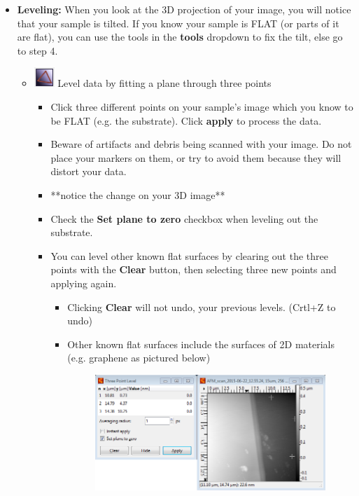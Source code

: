 \documentclass{../lab}
\begin{document}
\begin{itemize}
    \item\textbf{Leveling:} When you look at the 3D projection of your image, you will notice that your sample is tilted. If you know your sample is FLAT (or parts of it are flat), you can use the tools in the \textbf{tools} dropdown to fix the tilt, else go to step 4.
    \begin{itemize}
        \item \includegraphics[height=2em]{images/44.png} Level data by fitting a plane through three points
        \begin{itemize}
            \item Click three different points on your sample's image which you know to be FLAT (e.g. the substrate). Click \textbf{apply} to process the data.
            
            \item Beware of artifacts and debris being scanned with your image.  Do not place your markers on them, or try to avoid them because they will distort your data.
            
            \item **notice the change on your 3D image**
            
            \item Check the \textbf{Set plane to zero} checkbox when leveling out the substrate.
            
            \item You can level other known flat surfaces by clearing out the three points with the \textbf{Clear} button, then selecting three new points and applying again.
            \begin{itemize}
                \item Clicking \textbf{Clear} will not undo, your previous levels. (Crtl+Z to undo)
                
                \item Other known flat surfaces include the surfaces of 2D materials (e.g. graphene as pictured below)
                \begin{figure}[H]
                    \centering
                    \href{http://experimentationlab.berkeley.edu/sites/default/files/AFMImages/45.png}{\includegraphics[width=0.5\linewidth]{images/45.png}}
                    \caption{}
                \end{figure}
            \end{itemize}
            

\end{itemize}
\end{itemize}
\end{itemize}
\end{document}
